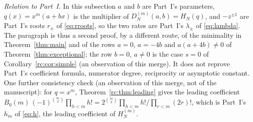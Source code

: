 \documentclass[11pt,a4paper]{article}
\numberwithin{equation}{section}
\theoremstyle{definition}
\theoremstyle{remark}
\begin{document}
\noindent\emph{Relation to Part~I.}  In this subsection $a$ and $b$ are
Part~I's parameters, $q(x)=x^m(a+bx)$ is the multiplier of
$D_N^{(m)}(a,b)=H_N(q)$, and $-z^{\pm1}$ are Part~I's roots $r_\pm$ of
\eqref{eq:rroots}, so the two rates are Part~I's $\lambda_\pm$ of
\eqref{eq:lambda}.  The paragraph is thus a second proof, by a different
route, of the minimality in Theorem~\ref{thm:main} and of the rows
$a=0$, $a=-4b$ and $a(a+4b)\ne0$ of Theorem~\ref{thm:exceptional}; the
row $b=0$, $a\ne0$ is the case $s=0$ of Corollary~\ref{rc:cor:simple}
(an observation of this merge).  It does not reprove Part~I's
coefficient formula, numerator degree, reciprocity or asymptotic
constant.  One further consistency check (an observation of this merge,
not of the manuscript): for $q=x^m$, Theorem~\ref{rc:thm:leading} gives
the leading coefficient $B_0(m)\,(-1)^{\binom m2}\prod_{h<m}h!
=2^{\binom m2}\prod_{h<m}h!/\prod_{r<m}(2r)!$, which is Part~I's $h_m$
of \eqref{eq:h}, the leading coefficient of $H_N^{(m)}$.
\end{document}
